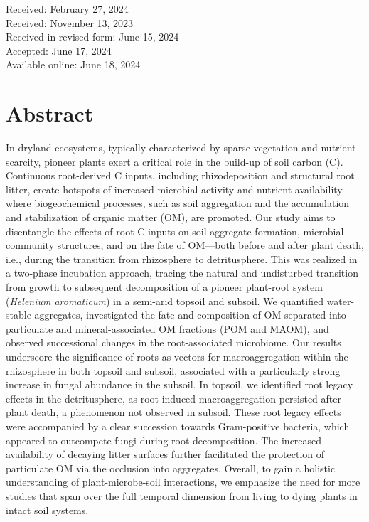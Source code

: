 \vspace{0.4cm}

\begin{flushleft}
    Received: February 27, 2024\\
    Received: November 13, 2023\\ 
    Received in revised form: June 15, 2024\\
    Accepted: June 17, 2024\\
    Available online: June 18, 2024
\end{flushleft}
  
\cleardoublepage

\section*{Abstract}

In dryland ecosystems, typically characterized by sparse vegetation and nutrient scarcity, pioneer plants exert a critical role in the build-up of soil carbon (C). Continuous root-derived C inputs, including rhizodeposition and structural root litter, create hotspots of increased microbial activity and nutrient availability where biogeochemical processes, such as soil aggregation and the accumulation and stabilization of organic matter (OM), are promoted. Our study aims to disentangle the effects of root C inputs on soil aggregate formation, microbial community structures, and on the fate of OM—both before and after plant death, i.e., during the transition from rhizosphere to detritusphere. This was realized in a two-phase incubation approach, tracing the natural and undisturbed transition from growth to subsequent decomposition of a pioneer plant-root system (\textit{Helenium aromaticum}) in a semi-arid topsoil and subsoil. We quantified water-stable aggregates, investigated the fate and composition of OM separated into particulate and mineral-associated OM fractions (POM and MAOM), and observed successional changes in the root-associated microbiome. Our results underscore the significance of roots as vectors for macroaggregation within the rhizosphere in both topsoil and subsoil, associated with a particularly strong increase in fungal abundance in the subsoil. In topsoil, we identified root legacy effects in the detritusphere, as root-induced macroaggregation persisted after plant death, a phenomenon not observed in subsoil. These root legacy effects were accompanied by a clear succession towards Gram-positive bacteria, which appeared to outcompete fungi during root decomposition. The increased availability of decaying litter surfaces further facilitated the protection of particulate OM via the occlusion into aggregates. Overall, to gain a holistic understanding of plant-microbe-soil interactions, we emphasize the need for more studies that span over the full temporal dimension from living to dying plants in intact soil systems.

